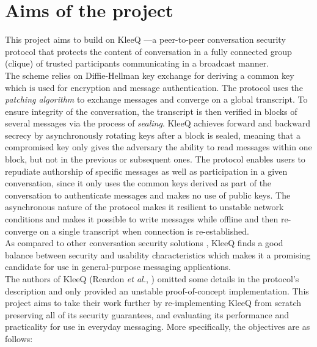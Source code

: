 \documentclass[a4paper, twoside, 12pt]{report}
\begin{document}
\section{Aims of the project}
\label{sec:intro.aims}
This project aims to build on KleeQ \cite{reardon2007kleeq}---a peer-to-peer conversation security protocol that protects the content of conversation in a fully connected group (clique) of trusted participants communicating in a broadcast manner. \\

The scheme relies on Diffie-Hellman key exchange for deriving a common key which is used for encryption and message authentication. The protocol uses the \emph{patching algorithm} to exchange messages and converge on a global transcript. To ensure integrity of the conversation, the transcript is then verified in blocks of several messages via the process of \emph{sealing}. KleeQ achieves forward and backward secrecy by asynchronously rotating keys after a block is sealed, meaning that a compromised key only gives the adversary the ability to read messages within one block, but not in the previous or subsequent ones. The protocol enables users to repudiate authorship of specific messages as well as participation in a given conversation, since it only uses the common keys derived as part of the conversation to authenticate messages and makes no use of public keys. The asynchronous nature of the protocol makes it resilient to unstable network conditions and makes it possible to write messages while offline and then re-converge on a single transcript when connection is re-established. \\

As compared to other conversation security solutions \cite{unger2015sok}, KleeQ finds a good balance between security and usability characteristics which makes it a promising candidate for use in general-purpose messaging applications. \\

The authors of KleeQ (Reardon \textit{et al.}, \cite{reardon2007kleeq}) omitted some details in the protocol's description and only provided an unstable proof-of-concept implementation. This project aims to take their work further by re-implementing KleeQ from scratch preserving all of its security guarantees, and evaluating its performance and practicality for use in everyday messaging. More specifically, the objectives are as follows:
\end{document}
